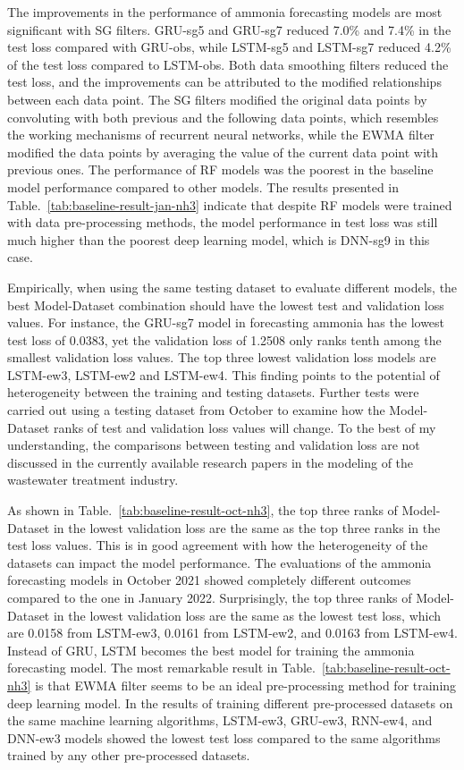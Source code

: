 The improvements in the performance of ammonia forecasting models are most significant with SG filters. GRU-sg5 and GRU-sg7 reduced 7.0\% and 7.4\% in the test loss compared with GRU-obs, while LSTM-sg5 and LSTM-sg7 reduced 4.2\% of the test loss compared to LSTM-obs. Both data smoothing filters reduced the test loss, and the improvements can be attributed to the modified relationships between each data point. The SG filters modified the original data points by convoluting with both previous and the following data points, which resembles the working mechanisms of recurrent neural networks, while the EWMA filter modified the data points by averaging the value of the current data point with previous ones. The performance of RF models was the poorest in the baseline model performance compared to other models. The results presented in Table.~\ref{tab:baseline-result-jan-nh3} indicate that despite RF models were trained with data pre-processing methods, the model performance in test loss was still much higher than the poorest deep learning model, which is DNN-sg9 in this case.

Empirically, when using the same testing dataset to evaluate different models, the best Model-Dataset combination should have the lowest test and validation loss values. For instance, the GRU-sg7 model in forecasting ammonia has the lowest test loss of 0.0383, yet the validation loss of 1.2508 only ranks tenth among the smallest validation loss values. The top three lowest validation loss models are LSTM-ew3, LSTM-ew2 and LSTM-ew4. This finding points to the potential of heterogeneity between the training and testing datasets. Further tests were carried out using a testing dataset from October to examine how the Model-Dataset ranks of test and validation loss values will change. To the best of my understanding, the comparisons between testing and validation loss are not discussed in the currently available research papers in the modeling of the wastewater treatment industry.

As shown in Table.~\ref{tab:baseline-result-oct-nh3}, the top three ranks of Model-Dataset in the lowest validation loss are the same as the top three ranks in the test loss values. This is in good agreement with how the heterogeneity of the datasets can impact the model performance. The evaluations of the ammonia forecasting models in October 2021 showed completely different outcomes compared to the one in January 2022. Surprisingly, the top three ranks of Model-Dataset in the lowest validation loss are the same as the lowest test loss, which are 0.0158 from LSTM-ew3, 0.0161 from LSTM-ew2, and 0.0163 from LSTM-ew4. Instead of GRU, LSTM becomes the best model for training the ammonia forecasting model. The most remarkable result in Table.~\ref{tab:baseline-result-oct-nh3} is that EWMA filter seems to be an ideal pre-processing method for training deep learning model. In the results of training different pre-processed datasets on the same machine learning algorithms, LSTM-ew3, GRU-ew3, RNN-ew4, and DNN-ew3 models showed the lowest test loss compared to the same algorithms trained by any other pre-processed datasets.

